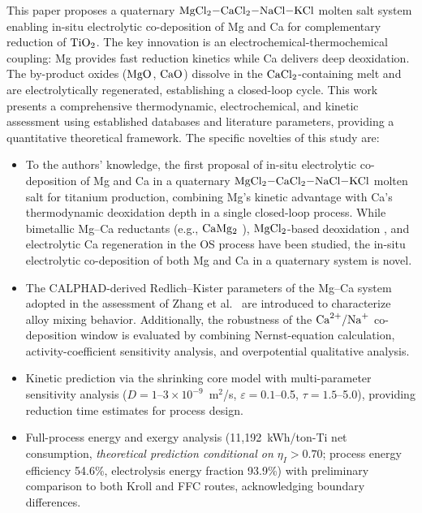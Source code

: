 \documentclass[sn-mathphys,Numbered]{sn-jnl}
\begin{document}
This paper proposes a quaternary $\ce{MgCl2-CaCl2-NaCl-KCl}$ molten salt system enabling in-situ electrolytic co-deposition of Mg and Ca for complementary reduction of $\ce{TiO2}$. The key innovation is an electrochemical-thermochemical coupling: Mg provides fast reduction kinetics while Ca delivers deep deoxidation. The by-product oxides ($\ce{MgO}$, $\ce{CaO}$) dissolve in the $\ce{CaCl2}$-containing melt and are electrolytically regenerated, establishing a closed-loop cycle. This work presents a comprehensive thermodynamic, electrochemical, and kinetic assessment using established databases \cite{barin1995,waldner1999} and literature parameters, providing a quantitative theoretical framework. The specific novelties of this study are:

\begin{itemize}
\item To the authors' knowledge, the first proposal of in-situ electrolytic co-deposition of Mg and Ca in a quaternary $\ce{MgCl2-CaCl2-NaCl-KCl}$ molten salt for titanium production, combining Mg's kinetic advantage with Ca's thermodynamic deoxidation depth in a single closed-loop process. While bimetallic Mg--Ca reductants (e.g., $\ce{CaMg2}$ \cite{lee2025}), $\ce{MgCl2}$-based deoxidation \cite{taninouchi2016}, and electrolytic Ca regeneration in the OS process \cite{ono2002} have been studied, the in-situ electrolytic co-deposition of both Mg and Ca in a quaternary system is novel.
\item The CALPHAD-derived Redlich--Kister parameters of the Mg--Ca system adopted in the assessment of Zhang et al.\ \cite{zhang2008mgce} are introduced to characterize alloy mixing behavior. Additionally, the robustness of the $\ce{Ca^{2+}/Na+}$ co-deposition window is evaluated by combining Nernst-equation calculation, activity-coefficient sensitivity analysis, and overpotential qualitative analysis.
\item Kinetic prediction via the shrinking core model with multi-parameter sensitivity analysis ($D = 1$--$3\times10^{-9}$~m$^2$/s, $\varepsilon = 0.1$--0.5, $\tau = 1.5$--5.0), providing reduction time estimates for process design.
\item Full-process energy and exergy analysis (11{,}192~kWh/ton-Ti net consumption, \emph{theoretical prediction conditional on $\eta_I > 0.70$}; process energy efficiency 54.6\%, electrolysis energy fraction 93.9\%) with preliminary comparison to both Kroll and FFC routes, acknowledging boundary differences.
\end{itemize}
\end{document}
